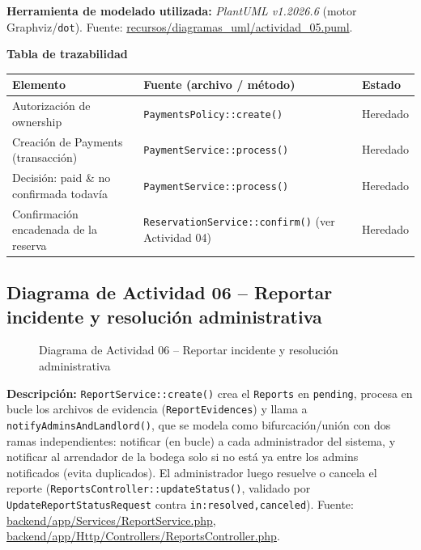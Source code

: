 \bigskip
{\sloppy\noindent\textbf{Herramienta de modelado utilizada:} \textit{PlantUML v1.2026.6} (motor Graphviz/\texttt{dot}). Fuente: \url{recursos/diagramas_uml/actividad_05.puml}.\par}

\bigskip
\noindent\textbf{Tabla de trazabilidad}
\begin{longtable}{|L{4cm}|L{7.5cm}|M{2.3cm}|}
\hline
{} \textbf{Elemento} & \textbf{Fuente (archivo / método)} & \textbf{Estado} \\ \hline
\endhead
Autorización de ownership & \texttt{PaymentsPolicy::create()} & Heredado \\ \hline
Creación de Payments (transacción) & \texttt{PaymentService::process()} & Heredado \\ \hline
Decisión: paid \& no confirmada todavía & \texttt{PaymentService::process()} & Heredado \\ \hline
Confirmación encadenada de la reserva & \texttt{ReservationService::confirm()} (ver Actividad 04) & Heredado \\ \hline
\end{longtable}
\clearpage

\subsection{Diagrama de Actividad 06 -- Reportar incidente y resolución administrativa}
\begin{figure}[H]
    \centering
    \caption{Diagrama de Actividad 06 -- Reportar incidente y resolución administrativa}
    \label{fig:actividad06}
\end{figure}

{\sloppy\noindent\textbf{Descripción:} \texttt{ReportService::create()} crea el \texttt{Reports} en \texttt{pending}, procesa en bucle los archivos de evidencia (\texttt{ReportEvidences}) y llama a \texttt{notifyAdminsAndLandlord()}, que se modela como bifurcación/unión con dos ramas independientes: notificar (en bucle) a cada administrador del sistema, y notificar al arrendador de la bodega solo si no está ya entre los admins notificados (evita duplicados). El administrador luego resuelve o cancela el reporte (\texttt{ReportsController::updateStatus()}, validado por \texttt{UpdateReportStatusRequest} contra \texttt{in:resolved,canceled}). Fuente: \url{backend/app/Services/ReportService.php}, \url{backend/app/Http/Controllers/ReportsController.php}.\par}

